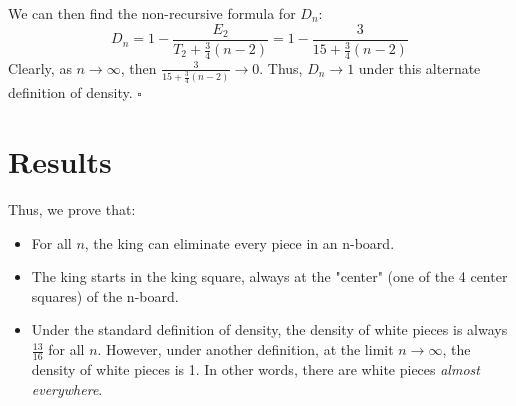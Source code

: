 \documentclass{article}
\begin{document}
   We can then find the non-recursive formula for $D_n$:
   $$D_n = 1 - \frac{E_2}{T_2 + \frac{3}{4}(n-2)} = 1 - \frac{3}{15 + \frac{3}{4}(n-2)}$$
Clearly, as $n \to \infty$, then $\frac{3}{15 + \frac{3}{4}(n-2)} \to 0$. Thus, $D_n \to 1$ under this alternate definition of density. $\square$
  \section*{Results}
Thus, we prove that:
\begin{itemize}
\item For all $n$, the king can eliminate every piece in an n-board. 
\item The king starts in the king square, always at the "center" (one of the 4 center squares) of the n-board.
\item Under the standard definition of density, the density of white pieces is always $\frac{13}{16}$ for all $n$. However, under another definition, at the limit $n \to \infty$, the density of white pieces is 1. In other words, there are white pieces \textit{almost everywhere}.
\end{itemize}
    \newpage

   
\end{document}

